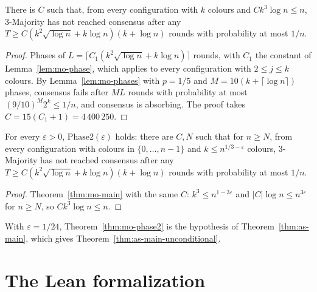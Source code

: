 \begin{theorem}\label{thm:mo-main}
\leanok
{}
There is $C$ such that, from every configuration with $k$ colours and $Ck^3\log n\le n$,
3-Majority has not reached consensus after any $T\ge C(k^2\sqrt{\log n}+k\log n)(k+\log n)$
rounds with probability at most $1/n$.
\end{theorem}
\begin{proof}\leanok
Phases of $L=\lceil C_1(k^2\sqrt{\log n}+k\log n)\rceil$ rounds, with $C_1$ the constant of
Lemma~\ref{lem:mo-phase}, which applies to every configuration with $2\le j\le k$ colours. By
Lemma~\ref{lem:mo-phases} with $p=1/5$ and $M=10(k+\lceil\log n\rceil)$ phases, consensus fails
after $ML$ rounds with probability at most $(9/10)^M2^k\le1/n$, and consensus is absorbing. The
proof takes $C=15(C_1+1)=4\,400\,250$.
\end{proof}

\begin{theorem}[Theorem~3.1]\label{thm:mo-phase2}
\leanok
{}
For every $\varepsilon>0$, $\mathrm{Phase2}(\varepsilon)$ holds: there are $C,N$ such that for
$n\ge N$, from every configuration with colours in $\{0,\dots,n-1\}$ and $k\le n^{1/3-\varepsilon}$
colours, 3-Majority has not reached consensus after any
$T\ge C(k^2\sqrt{\log n}+k\log n)(k+\log n)$ rounds with probability at most $1/n$.
\end{theorem}
\begin{proof}\leanok
Theorem~\ref{thm:mo-main} with the same $C$: $k^3\le n^{1-3\varepsilon}$ and
$|C|\log n\le n^{3\varepsilon}$ for $n\ge N$, so $Ck^3\log n\le n$.
\end{proof}

With $\varepsilon=1/24$, Theorem~\ref{thm:mo-phase2} is the hypothesis of
Theorem~\ref{thm:as-main}, which gives Theorem~\ref{thm:as-main-unconditional}.

\section{The Lean formalization}\label{sec:lean}


